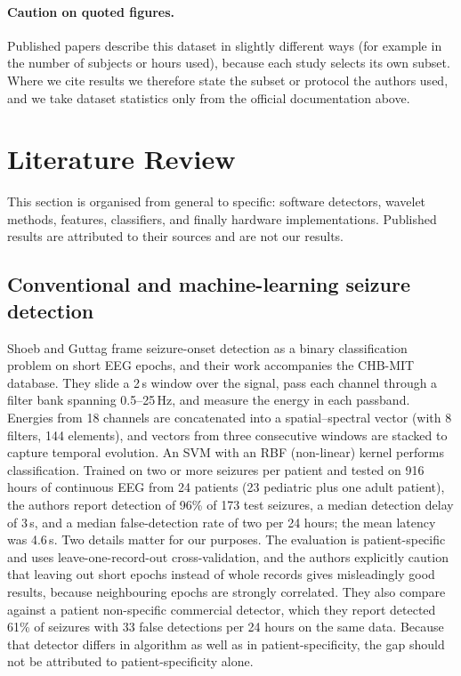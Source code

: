 \documentclass[10pt,twocolumn,letterpaper]{article}
\begin{document}
\paragraph{Caution on quoted figures.} Published papers describe this
dataset in slightly different ways (for example in the number of
subjects or hours used), because each study selects its own subset.
Where we cite results we therefore state the subset or protocol the
authors used, and we take dataset statistics only from the official
documentation above.

\section{Literature Review}
\label{sec:lit}

This section is organised from general to specific: software detectors,
wavelet methods, features, classifiers, and finally hardware
implementations. Published results are attributed to their sources and
are not our results.

\subsection{Conventional and machine-learning seizure detection}

Shoeb and Guttag \cite{shoeb2010icml} frame seizure-onset detection as a
binary classification problem on short EEG epochs, and their work
accompanies the CHB-MIT database. They slide a 2\,s window over the
signal, pass each channel through a filter bank spanning 0.5--25\,Hz, and
measure the energy in each passband. Energies from 18 channels are
concatenated into a spatial--spectral vector (with 8 filters, 144
elements), and vectors from three consecutive windows are stacked to
capture temporal evolution. An SVM with an RBF (non-linear) kernel
performs classification. Trained on two or more seizures per patient and
tested on 916 hours of continuous EEG from 24 patients (23 pediatric
plus one adult patient), the authors report detection of 96\% of 173
test seizures, a median detection delay of 3\,s, and a median
false-detection rate of two per 24 hours; the mean latency was 4.6\,s.
Two details matter for our purposes. The evaluation is patient-specific
and uses leave-one-record-out cross-validation, and the authors
explicitly caution that leaving out short epochs instead of whole
records gives misleadingly good results, because neighbouring epochs are
strongly correlated. They also compare against a patient non-specific
commercial detector, which they report detected 61\% of seizures with 33
false detections per 24 hours on the same data. Because that detector
differs in algorithm as well as in patient-specificity, the gap should
not be attributed to patient-specificity alone.
\end{document}
